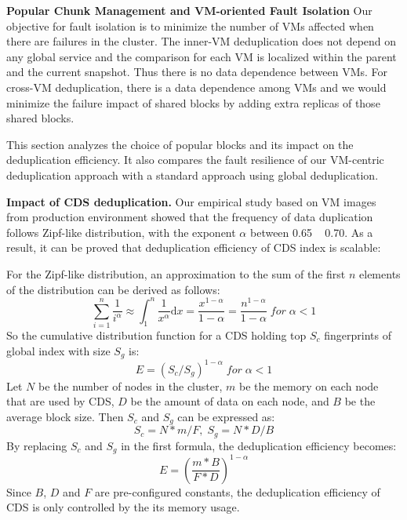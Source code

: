 {{\bf Popular Chunk Management and VM-oriented Fault Isolation}
Our objective for fault isolation is to minimize the number of VMs affected when there are failures
in the cluster.  The inner-VM deduplication does not depend on any global service and the comparison
for each VM is localized within the parent and the current snapshot.
Thus there is no data dependence between VMs.
For cross-VM deduplication, there is a data dependence among VMs and we would minimize the failure impact
of shared blocks by adding extra replicas of those shared blocks.

This section analyzes the choice of popular blocks and its impact on the deduplication efficiency.
It also  compares the  fault resilience of our VM-centric deduplication approach with a standard approach using 
global deduplication.


{\bf Impact of CDS deduplication.}
Our empirical study based on VM images from production environment\cite{ieeecloud} showed that the
frequency of data duplication follows Zipf-like distribution\cite{zipf},
with the exponent $\alpha$ between 0.65 ~ 0.70.
As a result, it can be proved that deduplication efficiency of CDS index is scalable:

For the Zipf-like distribution, an approximation to the sum of the first $n$ 
elements of the distribution can be derived as follows:
\begin{equation}
\sum_{i=1}^{n}\frac{1}{i^\alpha}\approx \int_{1}^{n}\frac{1}{x^\alpha}\mathrm{d}x=\frac{x^{1-\alpha}}{1-\alpha}=\frac{n^{1-\alpha}}{1-\alpha}\;  for\;  \alpha<1
\end{equation}
So the cumulative distribution function for a CDS holding top $S_c$ fingerprints
of global index with size $S_g$ is:
\begin{equation}
  E = (S_c / S_g)^{1-\alpha} \;  for\;  \alpha<1
\end{equation}
Let $N$ be the number of nodes in the cluster, $m$ be the memory on each node that are used by CDS, $D$ be the amount of data on each node, and $B$ be the average block size. Then $S_c$ and $S_g$ can be expressed as:
\begin{equation}
S_c = N*m/F, \; S_g = N*D/B
\end{equation}
By replacing $S_c$ and $S_g$ in the first formula, the deduplication efficiency becomes:
\begin{equation}
  E = (\frac{m*B}{F*D})^{1-\alpha}
\end{equation}
Since $B$, $D$ and $F$ are pre-configured constants, the deduplication efficiency of CDS is only controlled by the its memory usage.

}
